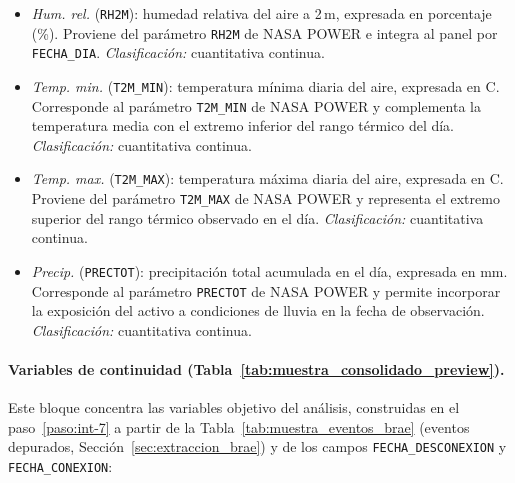     \begin{itemize}
        \item \textit{Hum. rel.} (\texttt{RH2M}): humedad relativa del aire a 2\,m, expresada en porcentaje (\%). Proviene del parámetro \texttt{RH2M} de NASA POWER e integra al panel por \texttt{FECHA\_DIA}. \textit{Clasificación:} cuantitativa continua.
    
        \item \textit{Temp. min.} (\texttt{T2M\_MIN}): temperatura mínima diaria del aire, expresada en \textdegree C. Corresponde al parámetro \texttt{T2M\_MIN} de NASA POWER y complementa la temperatura media con el extremo inferior del rango térmico del día. \textit{Clasificación:} cuantitativa continua.
    
        \item \textit{Temp. max.} (\texttt{T2M\_MAX}): temperatura máxima diaria del aire, expresada en \textdegree C. Proviene del parámetro \texttt{T2M\_MAX} de NASA POWER y representa el extremo superior del rango térmico observado en el día. \textit{Clasificación:} cuantitativa continua.
    
        \item \textit{Precip.} (\texttt{PRECTOT}): precipitación total acumulada en el día, expresada en mm. Corresponde al parámetro \texttt{PRECTOT} de NASA POWER y permite incorporar la exposición del activo a condiciones de lluvia en la fecha de observación. \textit{Clasificación:} cuantitativa continua.
    \end{itemize}
    
    \paragraph{Variables de continuidad (Tabla~\ref{tab:muestra_consolidado_preview}).}
    Este bloque concentra las variables objetivo del análisis, construidas en el paso~\ref{paso:int-7} a partir de la Tabla~\ref{tab:muestra_eventos_brae} (eventos depurados, Sección~\ref{sec:extraccion_brae}) y de los campos \texttt{FECHA\_DESCONEXION} y \texttt{FECHA\_CONEXION}:
    

